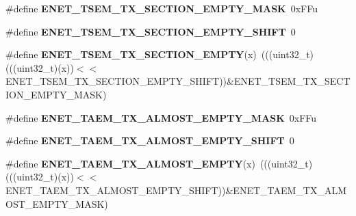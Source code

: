 \begin{DoxyCompactItemize}
\item 
\#define {\bfseries E\+N\+E\+T\+\_\+\+T\+S\+E\+M\+\_\+\+T\+X\+\_\+\+S\+E\+C\+T\+I\+O\+N\+\_\+\+E\+M\+P\+T\+Y\+\_\+\+M\+A\+SK}~0x\+F\+Fu\hypertarget{group__ENET__Register__Masks_ga2e0f28c4f62db96b87ef5ad97474613d}{}\label{group__ENET__Register__Masks_ga2e0f28c4f62db96b87ef5ad97474613d}

\item 
\#define {\bfseries E\+N\+E\+T\+\_\+\+T\+S\+E\+M\+\_\+\+T\+X\+\_\+\+S\+E\+C\+T\+I\+O\+N\+\_\+\+E\+M\+P\+T\+Y\+\_\+\+S\+H\+I\+FT}~0\hypertarget{group__ENET__Register__Masks_ga246af0bfb3c58b0af12dc0baf7142256}{}\label{group__ENET__Register__Masks_ga246af0bfb3c58b0af12dc0baf7142256}

\item 
\#define {\bfseries E\+N\+E\+T\+\_\+\+T\+S\+E\+M\+\_\+\+T\+X\+\_\+\+S\+E\+C\+T\+I\+O\+N\+\_\+\+E\+M\+P\+TY}(x)~(((uint32\+\_\+t)(((uint32\+\_\+t)(x))$<$$<$E\+N\+E\+T\+\_\+\+T\+S\+E\+M\+\_\+\+T\+X\+\_\+\+S\+E\+C\+T\+I\+O\+N\+\_\+\+E\+M\+P\+T\+Y\+\_\+\+S\+H\+I\+FT))\&E\+N\+E\+T\+\_\+\+T\+S\+E\+M\+\_\+\+T\+X\+\_\+\+S\+E\+C\+T\+I\+O\+N\+\_\+\+E\+M\+P\+T\+Y\+\_\+\+M\+A\+SK)\hypertarget{group__ENET__Register__Masks_gade2d164f1caaf77f9495ef0a25067e7e}{}\label{group__ENET__Register__Masks_gade2d164f1caaf77f9495ef0a25067e7e}

\item 
\#define {\bfseries E\+N\+E\+T\+\_\+\+T\+A\+E\+M\+\_\+\+T\+X\+\_\+\+A\+L\+M\+O\+S\+T\+\_\+\+E\+M\+P\+T\+Y\+\_\+\+M\+A\+SK}~0x\+F\+Fu\hypertarget{group__ENET__Register__Masks_ga477a6ff29213fd6111ad7c072547a40d}{}\label{group__ENET__Register__Masks_ga477a6ff29213fd6111ad7c072547a40d}

\item 
\#define {\bfseries E\+N\+E\+T\+\_\+\+T\+A\+E\+M\+\_\+\+T\+X\+\_\+\+A\+L\+M\+O\+S\+T\+\_\+\+E\+M\+P\+T\+Y\+\_\+\+S\+H\+I\+FT}~0\hypertarget{group__ENET__Register__Masks_ga7c41b19807f3598aa5cee0bf72c6c03f}{}\label{group__ENET__Register__Masks_ga7c41b19807f3598aa5cee0bf72c6c03f}

\item 
\#define {\bfseries E\+N\+E\+T\+\_\+\+T\+A\+E\+M\+\_\+\+T\+X\+\_\+\+A\+L\+M\+O\+S\+T\+\_\+\+E\+M\+P\+TY}(x)~(((uint32\+\_\+t)(((uint32\+\_\+t)(x))$<$$<$E\+N\+E\+T\+\_\+\+T\+A\+E\+M\+\_\+\+T\+X\+\_\+\+A\+L\+M\+O\+S\+T\+\_\+\+E\+M\+P\+T\+Y\+\_\+\+S\+H\+I\+FT))\&E\+N\+E\+T\+\_\+\+T\+A\+E\+M\+\_\+\+T\+X\+\_\+\+A\+L\+M\+O\+S\+T\+\_\+\+E\+M\+P\+T\+Y\+\_\+\+M\+A\+SK)\hypertarget{group__ENET__Register__Masks_ga985ae361e883de48b09f629a84cff541}{}\label{group__ENET__Register__Masks_ga985ae361e883de48b09f629a84cff541}


\end{DoxyCompactItemize}
